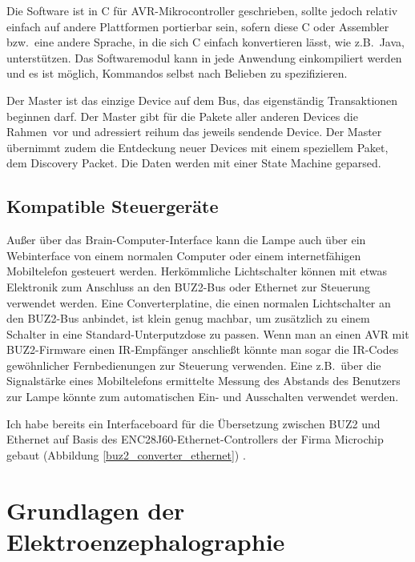 \documentclass[12pt,a4paper,notitlepage]{article}
\begin{document}
Die Software ist in C für AVR-Mikrocontroller geschrieben, sollte jedoch relativ einfach auf andere Plattformen portierbar sein, sofern diese C oder Assembler bzw.\ eine andere Sprache, in die sich C einfach konvertieren lässt, wie z.B.\ Java, unterstützen. Das Softwaremodul kann in jede Anwendung einkompiliert werden und es ist möglich, Kommandos selbst nach Belieben zu spezifizieren.

Der Master ist das einzige Device auf dem Bus, das eigenständig Transaktionen beginnen darf. Der Master gibt für die Pakete aller anderen Devices die \glqq Rahmen\grqq\ vor und adressiert reihum das jeweils sendende Device. Der Master übernimmt zudem die Entdeckung neuer Devices mit einem speziellem Paket, dem \glqq Discovery Packet\grqq. Die Daten werden mit einer State Machine geparsed.


\subsection{Kompatible Steuergeräte}
Außer über das Brain-Computer-Interface kann die Lampe auch über ein Webinterface von einem normalen Computer oder einem internetfähigen Mobiltelefon gesteuert werden. Herkömmliche Lichtschalter können mit etwas Elektronik zum Anschluss an den BUZ2-Bus oder Ethernet zur Steuerung verwendet werden. Eine Converterplatine, die einen normalen Lichtschalter an den BUZ2-Bus anbindet, ist klein genug machbar, um zusätzlich zu einem Schalter in eine Standard-Unterputzdose zu passen. Wenn man an einen AVR mit BUZ2-Firmware einen IR-Empfänger anschließt könnte man sogar die IR-Codes gewöhnlicher Fernbedienungen zur Steuerung verwenden. Eine z.B.\ über die Signalstärke eines Mobiltelefons ermittelte Messung des Abstands des Benutzers zur Lampe könnte zum automatischen Ein- und Ausschalten verwendet werden.

Ich habe bereits ein Interfaceboard für die Übersetzung zwischen BUZ2 und Ethernet auf Basis des ENC28J60-Ethernet-Controllers der Firma Microchip gebaut (Abbildung \ref{buz2_converter_ethernet}) \cite{MICROCHIP1}.
\section{Grundlagen der Elektroenzephalographie}
\end{document}

